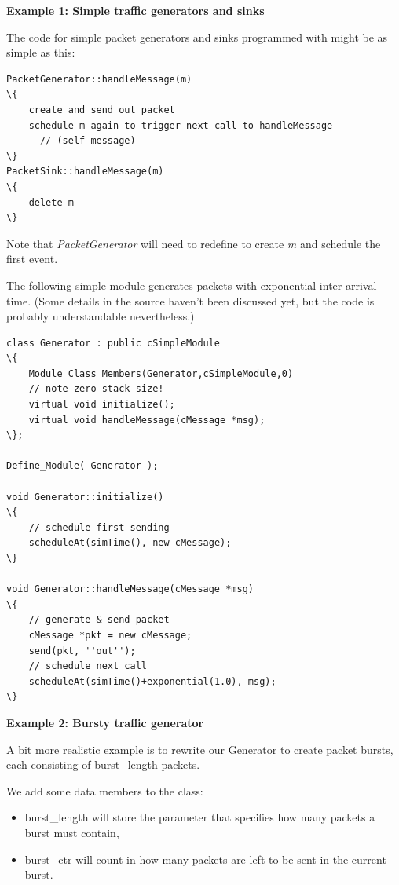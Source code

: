 \textbf{Example 1: Simple traffic generators and sinks}


The code for simple packet generators and sinks programmed with  might 
be as simple as this:

\begin{Verbatim}[commandchars=\\\{\}]
PacketGenerator::handleMessage(m)
\{
    create and send out packet
    schedule m again to trigger next call to handleMessage
      // (self-message)
\}
PacketSink::handleMessage(m)
\{
    delete m
\}
\end{Verbatim}



Note that \textit{PacketGenerator} will need to redefine  
to create \textit{m} and schedule the first event.

The following simple module generates packets with exponential 
inter-arrival time. (Some details in the source haven't been 
discussed yet, but the code is probably understandable nevertheless.)


\begin{Verbatim}[commandchars=\\\{\}]
class Generator : public cSimpleModule
\{ 
    Module_Class_Members(Generator,cSimpleModule,0) 
    // note zero stack size!
    virtual void initialize(); 
    virtual void handleMessage(cMessage *msg);
\};

Define_Module( Generator );

void Generator::initialize()
\{ 
    // schedule first sending
    scheduleAt(simTime(), new cMessage);
\}

void Generator::handleMessage(cMessage *msg)
\{ 
    // generate & send packet
    cMessage *pkt = new cMessage;
    send(pkt, ''out'');
    // schedule next call
    scheduleAt(simTime()+exponential(1.0), msg);
\}
\end{Verbatim}
  


\textbf{Example 2: Bursty traffic generator}


A bit more realistic example is to rewrite our Generator to create 
packet bursts, each consisting of burst\_length packets.


We add some data members to the class: 
\begin{itemize}
\item{burst\_length will store the parameter that specifies how many 
    packets a burst must contain,}
\item{burst\_ctr will count in how many packets are left to be sent 
    in the current burst.}
\end{itemize}

